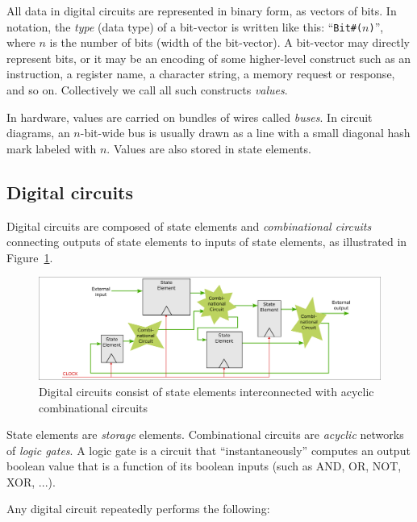 All data in digital circuits are represented in binary form, as
vectors of bits.  In {\BSV} notation, the \emph{type} (data type) of a
bit-vector is written like this: ``{\tt Bit\#($n$)}'', where $n$ is
the number of bits (width of the bit-vector).  A bit-vector may
directly represent bits, or it may be an encoding of some higher-level
construct such as an instruction, a register name, a character string,
a memory request or response, and so on.  Collectively we call all
such constructs \emph{values}.

In hardware, values are carried on bundles of wires called
\emph{buses}.  In circuit diagrams, an $n$-bit-wide bus is usually
drawn as a line with a small diagonal hash mark labeled with $n$.
Values are also stored in state elements.


\subsection{Digital circuits}


Digital circuits are composed of state elements and
\emph{combinational circuits} connecting outputs of state elements to
inputs of state elements, as illustrated in
Figure~\ref{Fig_BSV_Digital_Circuits}.
\begin{figure}[htbp]
  \centerline{\includegraphics[width=6in,angle=0]{Figures/Fig_BSV_Digital_Circuits}}
  \caption{\label{Fig_BSV_Digital_Circuits}
           Digital circuits consist of state elements interconnected
	   with acyclic combinational circuits}
\end{figure}

State elements are \emph{storage} elements.  Combinational circuits
are \emph{acyclic} networks of \emph{logic gates}.  A logic gate is a
circuit that ``instantaneously'' computes an output boolean value that
is a function of its boolean inputs (such as AND, OR, NOT, XOR, ...).

Any digital circuit repeatedly performs the following:

